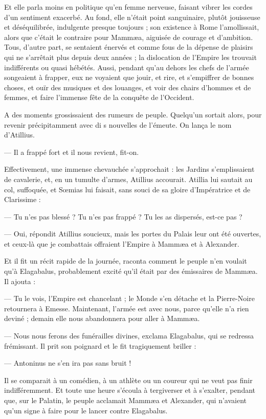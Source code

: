 \documentclass[a4paper, 11pt, oneside, polutonikogreek, french]{article}
\begin{document}
Et elle parla moins en politique qu'en femme nerveuse, faisant vibrer les cordes d'un sentiment exacerbé. Au fond, elle n'était point sanguinaire, plutôt jouisseuse et déséquilibrée, indulgente presque toujours ; son existence à Rome l'amollissait, alors que c'était le contraire pour Mammæa, aiguisée de courage et d'ambition. Tous, d'autre part, se sentaient énervés et comme fous de la dépense de plaisirs qui ne s'arrêtait plus depuis deux années ; la dislocation de l'Empire les trouvait indifférents ou quasi hébétés. Aussi, pendant qu'au dehors les chefs de l'armée songeaient à frapper, eux ne voyaient que jouir, et rire, et s'empiffrer de bonnes choses, et ouïr des musiques et des louanges, et voir des chairs d'hommes et de femmes, et faire l'immense fête de la conquête de l'Occident.

A des moments grossissaient des rumeurs de peuple. Quelqu'un sortait alors, pour revenir précipitamment avec di s nouvelles de l'émeute. On lança le nom d'Atillius.

--- Il a frappé fort et il nous revient, fit-on.

Effectivement, une immense chevauchée s'approchait : les Jardins s'emplissaient de cavalerie, et, en un tumulte d'armes, Atillius accourait. Atillia lui sautait au col, suffoquée, et Sœmias lui faisait, sans souci de sa gloire d'Impératrice et de Clarissime :

--- Tu n'es pas blessé ? Tu n'es pas frappé ? Tu les as dispersés, est-ce pas ?

--- Oui, répondit Atillius soucieux, mais les portes du Palais leur ont été ouvertes, et ceux-là que je combattais offraient l'Empire à Mammæa et à Alexander.

Et il fit un récit rapide de la journée, raconta comment le peuple n'en voulait qu'à Elagabalus, probablement excité qu'il était par des émissaires de Mammæa. Il ajouta :

--- Tu le vois, l'Empire est chancelant ; le Monde s'en détache et la Pierre-Noire retournera à Emesse. Maintenant, l'armée est avec nous, parce qu'elle n'a rien deviné ; demain elle nous abandonnera pour aller à Mammæa.

--- Nous nous ferons des funérailles divines, exclama Elagabalus, qui se redressa frémissant. Il prit son poignard et le fit tragiquement briller :

--- Antoninus ne s'en ira pas sans bruit !

Il se comparait à un comédien, à un athlète ou un coureur qui ne veut pas finir indifféremment. Et toute une heure s'écoula à tergiverser et à s'exalter, pendant que, sur le Palatin, le peuple acclamait Mammæa et Alexander, qui n'avaient qu'un signe à faire pour le lancer contre Elagabalus.
\end{document}
